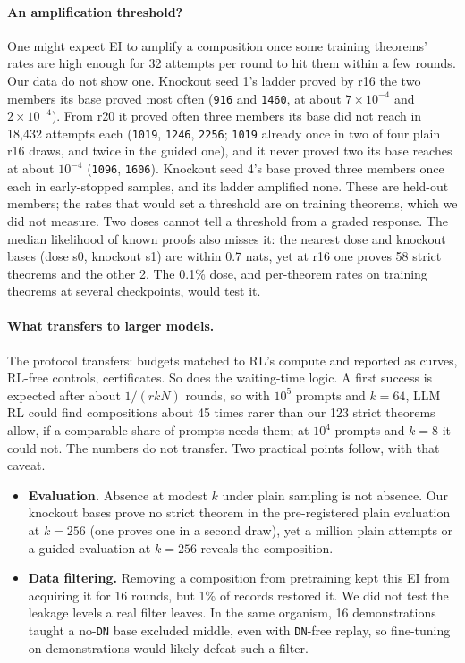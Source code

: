 \paragraph{An amplification threshold?} One might expect EI to amplify a composition once some training theorems' rates
are high enough for 32 attempts per round to hit them within a few rounds. Our data do not show one. Knockout seed 1's
ladder proved by r16 the two members its base proved most often (\texttt{916} and \texttt{1460}, at about
$7\times10^{-4}$ and $2\times10^{-4}$). From r20 it proved often three members its base did not reach in 18,432
attempts each (\texttt{1019}, \texttt{1246}, \texttt{2256}; \rv{} \texttt{1019} already once in two of four plain r16 draws, and twice in the guided one), and it never proved two its base reaches at about $10^{-4}$
(\texttt{1096}, \texttt{1606}). Knockout seed 4's base proved three members once each in early-stopped samples, and its
ladder amplified none. These are held-out members; the rates that would set a threshold are on training theorems, which
we did not measure. Two doses cannot tell a threshold from a graded response. The median likelihood of known proofs also
misses it: the nearest dose and knockout bases (dose s0, knockout s1) are within 0.7 nats, yet at r16 one proves 58
strict theorems and the other 2. The 0.1\% dose, and per-theorem rates on training
theorems at several checkpoints, would test it.

\paragraph{What transfers to larger models.} The protocol transfers: budgets matched to RL's compute and reported as
curves, RL-free controls, certificates. So does the waiting-time logic. A first success is expected after about
$1/(rkN)$ rounds, so with $10^5$ prompts and $k = 64$, LLM RL could find compositions about 45 times rarer than our 123
strict theorems allow, if a comparable share of prompts needs them; at $10^4$ prompts and $k = 8$ it could not. The numbers do not transfer. Two practical points
follow, with that caveat.
\begin{itemize}
\item \textbf{Evaluation.} Absence at modest $k$ under plain sampling is not absence. Our knockout bases \rv{} prove no strict theorem in the
pre-registered plain evaluation at $k=256$ (one proves one in a second draw), yet a million plain attempts or a guided evaluation at $k=256$ reveals the composition.
\item \textbf{Data filtering.} Removing a composition from pretraining kept this EI from acquiring it for 16 rounds, but
1\% of records restored it. We did not test the leakage levels a real filter leaves. In the same organism, 16
demonstrations taught a no-\texttt{DN} base excluded middle, even with \texttt{DN}-free replay, so fine-tuning on demonstrations would likely defeat such a
filter.
\end{itemize}

